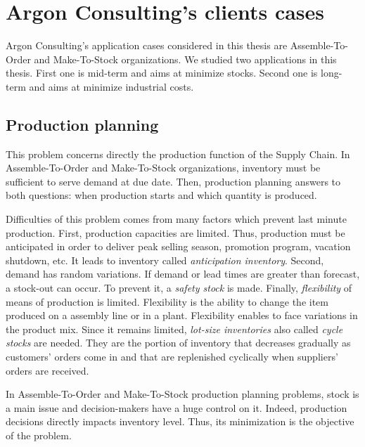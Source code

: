 \section{Argon Consulting's clients cases}


Argon Consulting's application cases considered in this thesis are Assemble-To-Order and Make-To-Stock organizations.
We studied two applications in this thesis.
First one is mid-term and aims at minimize stocks.
Second one is long-term and aims at minimize industrial costs.


\subsection{Production planning}
\label{sec:business-context:argon:pdp}


This problem concerns directly the production function of the Supply Chain.
In Assemble-To-Order and Make-To-Stock organizations, inventory must be sufficient to serve demand at due date.
Then, production planning answers to both questions: when production starts and which quantity is produced.

Difficulties of this problem comes from many factors which prevent last minute production.
First, production capacities are limited.
Thus, production must be anticipated in order to deliver peak selling season, promotion program, vacation shutdown, etc.
It leads to inventory called \emph{anticipation inventory}.
Second, demand has random variations.
If demand or lead times are greater than forecast, a stock-out can occur.
To prevent it, a \emph{safety stock} is made.
Finally, \emph{flexibility} of means of production is limited.
Flexibility is the ability to change the item produced on a assembly line or in a plant.
Flexibility enables to face variations in the product mix.
Since it remains limited, \emph{lot-size inventories} also called \emph{cycle stocks} are needed. They are the portion of inventory that decreases gradually as customers’ orders come in and that are replenished cyclically when suppliers’ orders are received.


In Assemble-To-Order and Make-To-Stock production planning problems, stock is a main issue and decision-makers have a huge control on it.
Indeed, production decisions directly impacts inventory level.
Thus, its minimization is the objective of the problem.


